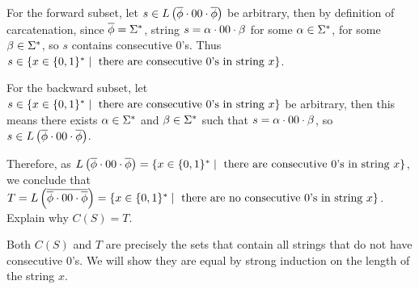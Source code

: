 \documentclass[11pt, sakura, night, 1in]{LatexTemplate/hw}
\begin{document}
For the forward subset, let $s\in L\left(\overline{\phi}\cdot00\cdot\overline{\phi}\right)$ be arbitrary, then by definition of carcatenation, since $\overline{\phi}=\Sigma^*$, string $s=\alpha\cdot00\cdot\beta$ for some $\alpha\in\Sigma^*$, for some $\beta\in\Sigma^*$, so $s$ contains consecutive $0$'s. Thus $s\in \{x\in\{0,1\}^*\mid \text{ there are consecutive $0$'s in string $x$}\}$.

For the backward subset, let $s\in \{x\in\{0,1\}^*\mid \text{ there are consecutive $0$'s in string $x$}\}$ be arbitrary, then this means there exists $\alpha\in\Sigma^*$ and $\beta\in\Sigma^*$ such that $s=\alpha\cdot00\cdot\beta$, so $s\in L\left(\overline{\phi}\cdot00\cdot\overline{\phi}\right)$.

Therefore, as $L\left(\overline{\phi}\cdot00\cdot\overline{\phi}\right)=\{x\in\{0,1\}^*\mid \text{ there are consecutive $0$'s in string $x$}\}$, we conclude that $T=L\left(\overline{\overline{\phi}\cdot00\cdot\overline{\phi}}\right)=\{x\in\{0,1\}^*\mid \text{ there are no consecutive $0$'s in string $x$}\}$.\\


 Explain why $C(S)=T$.

Both $C(S)$ and $T$ are precisely the sets that contain all strings that do not have consecutive $0$'s. We will show they are equal by strong induction on the length of the string $x$.
\end{document}
